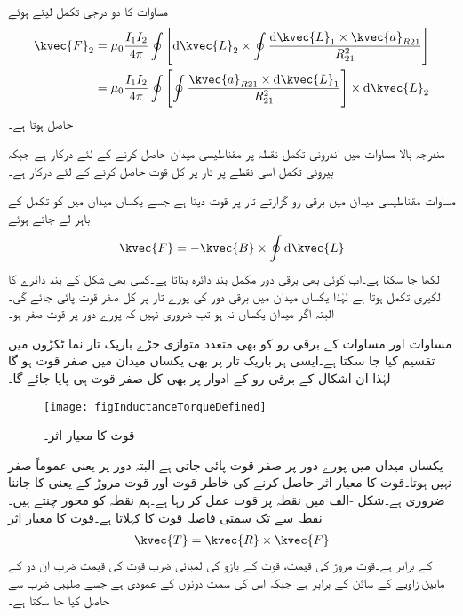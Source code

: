 مساوات  کا دو درجی تکمل لیتے ہوئے
\begin{gather}
 \begin{aligned}\label{مساوات_امالہ_تاروں_کے_مابین_قوت}
\kvec{F}_2 &=\mu_0 \frac{I_1 I_2}{4\pi } \oint\left[\dif \kvec{L}_2 \times \oint\frac{\dif \kvec{L}_1 \times \kvec{a}_{R21}}{R_{21}^2}\right]\\
&=\mu_0 \frac{I_1 I_2}{4\pi } \oint\left[ \oint\frac{ \kvec{a}_{R21}\times \dif \kvec{L}_1}{R_{21}^2}\right] \times \dif \kvec{L}_2
\end{aligned}
\end{gather}
حاصل ہوتا ہے۔

مندرجہ بالا مساوات میں اندرونی تکمل نقطہ  پر مقناطیسی میدان حاصل کرنے کے لئے درکار ہے جبکہ بیرونی تکمل اسی نقطے پر تار پر کل قوت حاصل کرنے کے لئے درکار ہے۔

مساوات   مقناطیسی میدان میں برقی رو گزارتے تار پر قوت دیتا ہے جسے یکساں میدان میں  کو تکمل کے باہر لے جاتے ہوئے
\begin{align*}
\kvec{F}=-\kvec{B} \times \oint \dif \kvec{L}
\end{align*}
 لکھا جا سکتا ہے۔اب کوئی بھی برقی دور مکمل بند دائرہ بناتا ہے۔کسی بھی شکل کے بند دائرے  کا لکیری تکمل  ہوتا ہے لہٰذا یکساں میدان میں برقی دور کی پورے تار پر کل صفر قوت پائی جائے گی۔البتہ اگر میدان یکساں نہ ہو تب ضروری نہیں کہ پورے دور پر قوت صفر ہو۔

مساوات  اور مساوات  کے برقی رو کو بھی متعدد متوازی جڑے باریک تار نما ٹکڑوں میں تقسیم کیا جا سکتا ہے۔ایسی ہر باریک تار پر بھی یکساں میدان میں صفر قوت ہو گا لہٰذا ان اشکال کے برقی رو کے ادوار پر بھی کل صفر قوت ہی پایا جائے گا۔
\begin{figure}
\centering
\texttt{[image: figInductanceTorqueDefined]}
\caption{قوت کا معیار اثر۔}
\label{شکل_امالہ_قوت_کا_معیار_اثر_تعریف}
\end{figure}

یکساں میدان میں پورے دور پر صفر قوت پائی جاتی ہے البتہ دور پر  یعنی  عموماً صفر نہیں ہوتا۔قوت کا معیار اثر حاصل کرنے کی خاطر قوت اور قوت مروڑ کے  یعنی  کا جاننا ضروری ہے۔شکل -الف میں نقطہ  پر قوت  عمل کر رہا ہے۔ہم نقطہ  کو محور چنتے ہیں۔ نقطہ  سے  تک سمتی فاصلہ  قوت کا   کہلاتا ہے۔قوت کا معیار اثر 
\begin{align}
\kvec{T}=\kvec{R} \times \kvec{F}
\end{align}
کے برابر ہے۔قوت مروڑ کی قیمت، قوت کے بازو کی لمبائی ضرب قوت کی قیمت ضرب ان دو کے مابین زاویے کے سائن کے برابر ہے جبکہ اس کی سمت دونوں کے عمودی ہے جسے صلیبی ضرب سے حاصل کیا جا سکتا ہے۔

